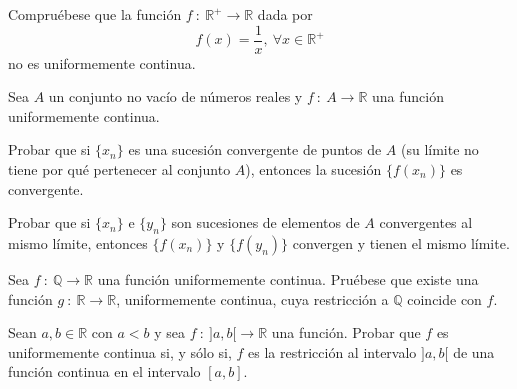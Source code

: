 \begin{ejercicio}
    Compruébese que la función $f ~:~ \mathbb{R}^+ \longrightarrow \mathbb{R}$ dada por
    \begin{equation*}
        f(x) = \frac{1}{x}, ~ \forall x \in \mathbb{R}^+
    \end{equation*}
    no es uniformemente continua.
\end{ejercicio}

\begin{ejercicio}
    Sea $A$ un conjunto no vacío de números reales y $f ~:~ A \longrightarrow \mathbb{R}$ una función uniformemente continua.
    
    Probar que si $\{x_n\}$ es una sucesión convergente de puntos de $A$ (su límite no tiene por qué pertenecer al conjunto $A$), 
    entonces la sucesión $\{f(x_n)\}$ es convergente.
    
    Probar que si $\{x_n\}$ e $\{y_n\}$ son sucesiones de elementos de $A$ convergentes al mismo límite, entonces $\{f(x_n)\}$ y $\{f(y_n)\}$ convergen y tienen el mismo límite.
\end{ejercicio}

\begin{ejercicio}
    Sea $f ~:~ \mathbb{Q} \longrightarrow \mathbb{R}$ una función uniformemente continua. Pruébese que existe una función
    $g ~:~ \mathbb{R} \longrightarrow \mathbb{R}$, uniformemente continua, cuya restricción a $\mathbb{Q}$ coincide con $f$.
\end{ejercicio}

\begin{ejercicio}
    Sean $a,b \in \mathbb{R}$ con $a < b$ y sea $f ~:~ ]a,b[ \longrightarrow \mathbb{R}$ una función.
    Probar que $f$ es uniformemente continua si, y sólo si, $f$ es la restricción al intervalo $]a,b[$ de una función continua en el intervalo $[a,b]$.
\end{ejercicio}